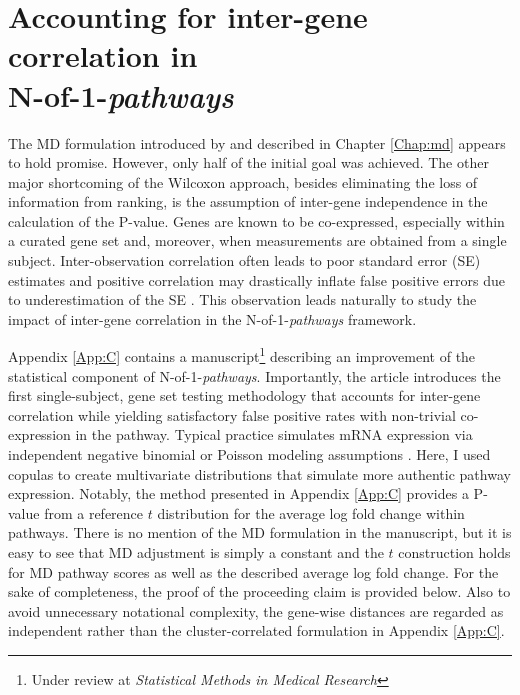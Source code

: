 \chapter{Accounting for inter-gene correlation in\\N-of-1-\emph{pathways}} \label{Chap:ct}

\indent \indent The MD formulation introduced by \citet{Schissler2015} and described in Chapter \ref{Chap:md} appears to hold promise. However, only half of the initial goal was achieved. The other major shortcoming of the Wilcoxon approach, besides eliminating the loss of information from ranking, is the assumption of inter-gene independence in the calculation of the P-value. Genes are known to be co-expressed, especially within a curated gene set \citep{Tamayo2016} and, moreover, when measurements are obtained from a single subject. Inter-observation correlation often leads to poor standard error (SE) estimates and positive correlation may drastically inflate false positive errors due to underestimation of the SE \citep{Wu2012}. This observation leads naturally to study the impact of inter-gene correlation in the N-of-1-\emph{pathways} framework.

Appendix \ref{App:C} contains a manuscript\footnote{Under review at \emph{Statistical Methods in Medical Research}} describing an improvement of the statistical component of N-of-1-\emph{pathways}. Importantly, the article introduces the first single-subject, gene set testing methodology that accounts for inter-gene correlation while yielding satisfactory false positive rates with non-trivial co-expression in the pathway. Typical practice simulates mRNA expression via independent negative binomial or Poisson modeling assumptions \citep{Gardeux2014}. Here, I used copulas \citep{Genest2007,Yan2007} to create multivariate distributions that simulate more authentic pathway expression. Notably, the method presented in Appendix \ref{App:C} provides a P-value from a reference $t$ distribution for the average log fold change within pathways. There is no mention of the MD formulation in the manuscript, but it is easy to see that MD adjustment is simply a constant and the $t$ construction holds for MD pathway scores as well as the described average log fold change. For the sake of completeness, the proof of the proceeding claim is provided below. Also to avoid unnecessary notational complexity, the gene-wise distances are regarded as independent rather than the cluster-correlated formulation in Appendix \ref{App:C}.

